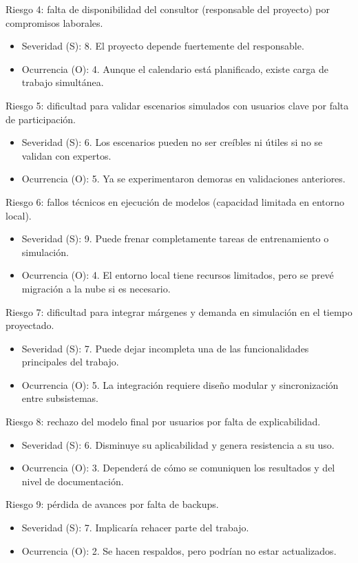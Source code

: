 \documentclass[
11pt, %
]{charter}
\begin{document}
Riesgo 4: falta de disponibilidad del consultor (responsable del proyecto) por compromisos laborales.
\begin{itemize}
	\item Severidad (S):  8. El proyecto depende fuertemente del responsable.
	\item Ocurrencia (O): 4. Aunque el calendario está planificado, existe carga de trabajo simultánea.
\end{itemize}

Riesgo 5: dificultad para validar escenarios simulados con usuarios clave por falta de participación.
\begin{itemize}
	\item Severidad (S):  6. Los escenarios pueden no ser creíbles ni útiles si no se validan con expertos.
	\item Ocurrencia (O): 5. Ya se experimentaron demoras en validaciones anteriores.
\end{itemize}

Riesgo 6: fallos técnicos en ejecución de modelos (capacidad limitada en entorno local).
\begin{itemize}
	\item Severidad (S): 9. Puede frenar completamente tareas de entrenamiento o simulación.
	\item Ocurrencia (O): 4. El entorno local tiene recursos limitados, pero se prevé migración a la nube si es necesario.
\end{itemize}

Riesgo 7: dificultad para integrar márgenes y demanda en simulación en el tiempo proyectado.
\begin{itemize}
	\item Severidad (S):  7. Puede dejar incompleta una de las funcionalidades principales del trabajo.
	\item Ocurrencia (O): 5. La integración requiere diseño modular y sincronización entre subsistemas.
\end{itemize}

Riesgo 8: rechazo del modelo final por usuarios por falta de explicabilidad.
\begin{itemize}
	\item Severidad (S):  6. Disminuye su aplicabilidad y genera resistencia a su uso.
	\item Ocurrencia (O): 3. Dependerá de cómo se comuniquen los resultados y del nivel de documentación.
\end{itemize}

Riesgo 9: pérdida de avances por falta de backups.
\begin{itemize}
	\item Severidad (S):  7. Implicaría rehacer parte del trabajo.
	\item Ocurrencia (O): 2. Se hacen respaldos, pero podrían no estar actualizados.
\end{itemize}
\end{document}

